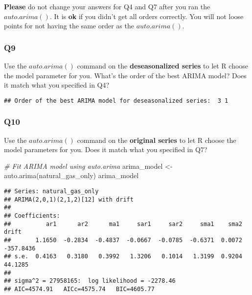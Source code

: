 \documentclass[
]{article}
\newenvironment{Shaded}{\begin{snugshade}}{\end{snugshade}}
\newcommand{\CommentTok}[1]{\textcolor[rgb]{0.56,0.35,0.01}{\textit{#1}}}
\newcommand{\DecValTok}[1]{\textcolor[rgb]{0.00,0.00,0.81}{#1}}
\newcommand{\FunctionTok}[1]{\textcolor[rgb]{0.00,0.00,0.00}{#1}}
\newcommand{\NormalTok}[1]{#1}
\newcommand{\OtherTok}[1]{\textcolor[rgb]{0.56,0.35,0.01}{#1}}
\newcommand{\SpecialCharTok}[1]{\textcolor[rgb]{0.00,0.00,0.00}{#1}}
\newcommand{\StringTok}[1]{\textcolor[rgb]{0.31,0.60,0.02}{#1}}
\begin{document}
\textbf{Please} do not change your answers for Q4 and Q7 after you ran
the \(auto.arima()\). It is \textbf{ok} if you didn't get all orders
correctly. You will not loose points for not having the same order as
the \(auto.arima()\).

\hypertarget{q9}{%
\subsubsection{Q9}\label{q9}}

Use the \(auto.arima()\) command on the \textbf{deseasonalized series}
to let R choose the model parameter for you. What's the order of the
best ARIMA model? Does it match what you specified in Q4?

\begin{Shaded}
\end{Shaded}

\begin{verbatim}
## Order of the best ARIMA model for deseasonalized series:  3 1
\end{verbatim}

\hypertarget{q10}{%
\subsubsection{Q10}\label{q10}}

Use the \(auto.arima()\) command on the \textbf{original series} to let
R choose the model parameters for you. Does it match what you specified
in Q7?

\begin{Shaded}
\begin{Highlighting}[]
\CommentTok{\# Fit ARIMA model using auto.arima}
\NormalTok{arima\_model }\OtherTok{\textless{}{-}} \FunctionTok{auto.arima}\NormalTok{(natural\_gas\_only)}
\NormalTok{arima\_model}
\end{Highlighting}
\end{Shaded}

\begin{verbatim}
## Series: natural_gas_only 
## ARIMA(2,0,1)(2,1,2)[12] with drift 
## 
## Coefficients:
##          ar1      ar2      ma1     sar1     sar2     sma1    sma2      drift
##       1.1650  -0.2834  -0.4837  -0.0667  -0.0785  -0.6371  0.0072  -357.8436
## s.e.  0.4163   0.3180   0.3992   1.3206   0.1014   1.3199  0.9204    44.1285
## 
## sigma^2 = 27958165:  log likelihood = -2278.46
## AIC=4574.91   AICc=4575.74   BIC=4605.77
\end{verbatim}
\end{document}
